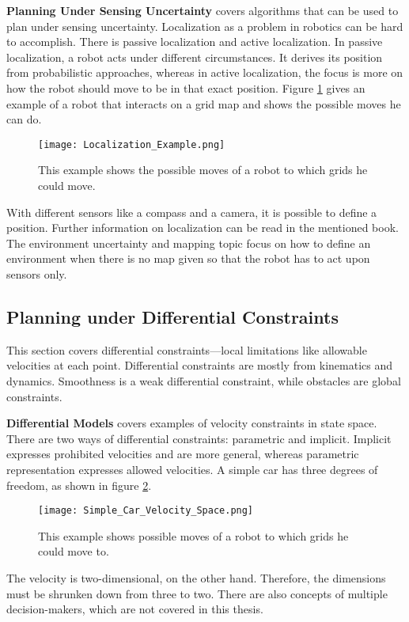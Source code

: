 \textbf{Planning Under Sensing Uncertainty} covers algorithms that can be used to plan under sensing uncertainty. Localization as a problem in robotics can be hard to accomplish. There is passive localization and active localization. In passive localization, a robot acts under different circumstances. It derives its position from probabilistic approaches, whereas in active localization, the focus is more on how the robot should move to be in that exact position. Figure \ref{fig:Localization Example} gives an example of a robot that interacts on a grid map and shows the possible moves he can do. \cite{planning_algorithms_steven_m_lavalle}
\begin{figure}[H]
    \centering
    \texttt{[image: Localization\_Example.png]}
    \caption{This example shows the possible moves of a robot to which grids he could move. \cite{planning_algorithms_steven_m_lavalle}}
    \label{fig:Localization Example}
\end{figure}

With different sensors like a compass and a camera, it is possible to define a position. Further information on localization can be read in the mentioned book. The environment uncertainty and mapping topic focus on how to define an environment when there is no map given so that the robot has to act upon sensors only. \cite{planning_algorithms_steven_m_lavalle}

\subsection{Planning under Differential Constraints} \label{sec:Planning under Differential Constraints}
This section covers differential constraints—local limitations like allowable velocities at each point. Differential constraints are mostly from kinematics and dynamics. Smoothness is a weak differential constraint, while obstacles are global constraints.

\textbf{Differential Models} covers examples of velocity constraints in state space. There are two ways of differential constraints: parametric and implicit. Implicit expresses prohibited velocities and are more general, whereas parametric representation expresses allowed velocities. A simple car has three degrees of freedom, as shown in figure \ref{fig:Simple Car Velocity Space}.
\begin{figure}[H]
    \centering
    \texttt{[image: Simple\_Car\_Velocity\_Space.png]}
    \caption{This example shows possible moves of a robot to which grids he could move to. \cite{planning_algorithms_steven_m_lavalle}}
    \label{fig:Simple Car Velocity Space}
\end{figure}
The velocity is two-dimensional, on the other hand. Therefore, the dimensions must be shrunken down from three to two. There are also concepts of multiple decision-makers, which are not covered in this thesis.

